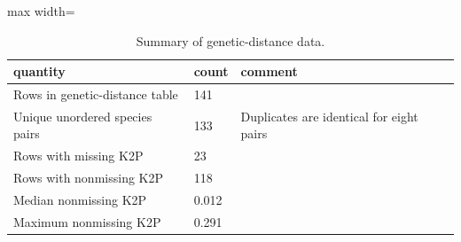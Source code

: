 \begin{table}
\caption{Summary of genetic-distance data.}
\label{tab:gd_summary}
\begin{adjustbox}{max width=\textwidth}
\begin{tabular}{lll}
\toprule
quantity & count & comment \\
\midrule
Rows in genetic-distance table & 141 &  \\
Unique unordered species pairs & 133 & Duplicates are identical for eight pairs \\
Rows with missing K2P & 23 &  \\
Rows with nonmissing K2P & 118 &  \\
Median nonmissing K2P & 0.012 &  \\
Maximum nonmissing K2P & 0.291 &  \\
\bottomrule
\end{tabular}
\end{adjustbox}
\end{table}
